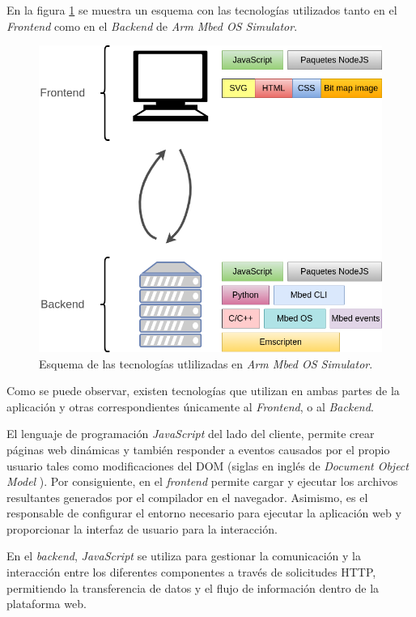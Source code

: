 En la figura \ref{fig:FrontendBackendMbed} se muestra un esquema con las tecnologías utilizados tanto en el \textit{Frontend} como en el \textit{Backend} de \textit{Arm Mbed OS Simulator}.

\begin{figure}[ht]
	\centering
	\includegraphics[scale=.47]{./Figures/FrontendBackendMbed.png}
	\caption{Esquema de las tecnologías utlilizadas en \textit{Arm Mbed OS Simulator}.}
	\label{fig:FrontendBackendMbed}
\end{figure}

\newpage

Como se puede observar, existen tecnologías que utilizan en ambas partes de la aplicación y otras correspondientes únicamente al \textit{Frontend}, o al \textit{Backend}.

El lenguaje de programación \textit{JavaScript} del lado del cliente, permite crear páginas web dinámicas y también responder a eventos causados por el propio usuario tales como modificaciones del DOM (siglas en inglés de \textit{Document Object Model} \citep{DOM}). Por consiguiente, en el \textit{frontend} permite cargar y ejecutar los archivos resultantes generados por el compilador en el navegador. Asimismo, es el responsable de configurar el entorno necesario para ejecutar la aplicación web y proporcionar la interfaz de usuario para la interacción. 

En el \textit{backend}, \textit{JavaScript} se utiliza para gestionar la comunicación y la interacción entre los diferentes componentes a través de solicitudes HTTP, permitiendo la transferencia de datos y el flujo de información dentro de la plataforma web.


